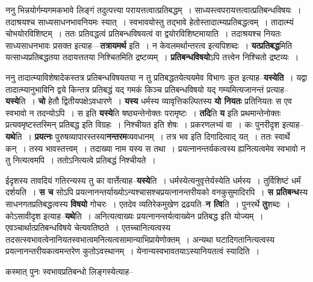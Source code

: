 \documentclass[article,12pt,a4paper]{memoir}
\begin{document}
	  \endgroup
	

	  \pstart ननु भिन्नयोर्गम्यगमकभावे लिङ्गं तदुत्पत्त्या परायत्तत्वात्प्रतिबद्धम् । साध्यस्त्वपरायत्तत्वात्प्रतिबन्धविषयः । तदाश्रयश्च साध्यसाधनभावनियमः स्यात् । स्वभावयोस्तु तद्भावे हेतोस्तादात्म्यप्रतिबद्धत्वम् । तादात्म्यं चोभयोरविशिष्टम् । ततः प्रतिवद्धत्वं प्रतिबन्धविषयत्वं वा द्वयोरविशिष्टमायाति । तदाश्रयश्च नियतः साध्यसाधनभावः प्रसक्त इत्याह—\textbf{तत्रायमर्थ} इति । न केवलमर्थान्तरत्व इत्यपिशब्दः । \textbf{यत्प्रतिबद्ध}मिति यत्साध्यप्रतिबद्धतया तदायत्ततया निश्चितमिति द्रष्टव्यम् । \textbf{प्रतिबन्धविषयो}ऽपि तत्त्वेन निश्चितो द्रष्टव्यः ।
	\pend
      

	  \pstart ननु तादात्म्याविशेषादेकस्तत्र प्रतिबन्धविषयतया न तु प्रतिबद्धतयेत्ययमेव विभागः कुत इत्याह--\textbf{यस्येति} । यद्वा तादात्म्यानुभाविनि द्वये किन्तत्र प्रतिबद्धं यद् गमकं किञ्च प्रतिबन्धविषयो यद् गम्यमित्यजानन्तं प्रत्याह--\textbf{यस्ये}ति । \textbf{चो} हेतौ द्वितीयपक्षेऽवधारणे । \textbf{यस्य} धर्मस्य व्यावृत्तिकल्पितस्य \textbf{यो नियतः} प्रतिनियतः स एव स्वभावो न तदन्योऽपि । स इति \textbf{यस्ये}ति षष्ठ्यन्तेनोक्तः परामृष्टः । \textbf{तदि}ति \textbf{य} इति प्रथमान्तेनोक्तः प्रत्यवमृष्टस्तस्मिन् प्रतिबद्ध इति विग्रहः । निश्चीयत इति शेषः । प्रकरणलभ्यं वा । कः पुनरीदृश इत्याह--\textbf{यथे}ति । \textbf{प्रयत्नः} पुरुषव्यापारस्तस्या\textbf{नन्तरम}व्यवधानम् । तत्र भव इति दिगादित्वाद् यत् । ततः स्वार्थे कन् । तस्य भावस्तत्त्वम् । तदाख्या नाम यस्य स तथा । प्रयत्नानन्तर्यकत्वस्य ह्यनित्यत्वमेव स्वभावो न तु नित्यत्वमपि । ततोऽनित्यत्वे प्रतिबद्धं निश्चीयते ।
	\pend
      

	  \pstart ईदृशस्य तावदियं गतिरन्यस्य तु का वार्त्तेत्याह--\textbf{यस्ये}ति । धर्मस्येत्यनुवृत्तेर्यस्येति धर्मस्य । तुर्विशिष्टं धर्मं दर्शयति । \textbf{स च} सोऽपि प्रयत्नानन्तर्याख्योऽन्यश्चासश्चप्रयत्नानन्तरीयको वनकुसुमादिरपि । \textbf{स प्रतिबन्ध}स्य साधनगतप्रतिबद्धत्वस्य \textbf{विषयो} गोचरः । एतदेव व्यतिरेकमुखेण द्रढयति--\textbf{न त्वि}ति । पुनरर्थे \textbf{तु}शब्दः । कोऽसावीदृश इत्याह--\textbf{यथे}ति । अनित्यत्वाख्यः प्रयत्नानन्तर्यत्वाख्येन प्रतिबद्ध इति योज्यम् । एवञ्चार्थात्प्रतिबन्धविषये चेत्यव\leavevmode{}तिष्ठते । एतच्चानित्यत्वस्य तदसत्स्वभावत्वेनानियतस्वभात्वमनित्यत्वसामान्याभिप्रायेणोक्तम् । अन्यथा घटादिगतानित्यत्वस्य प्रयत्नानन्तरीयकत्वमन्तरेण कुतोऽवस्थानम् । येनान्यस्वभावतयाऽस्यानियतत्वं स्यादिति ।
	\pend
	  \bigskip
	  \begingroup
	

	  \pstart कस्मात् पुनः स्वभावप्रतिबन्धो लिङ्गस्येत्याह--
	\pend
        
\end{document}

